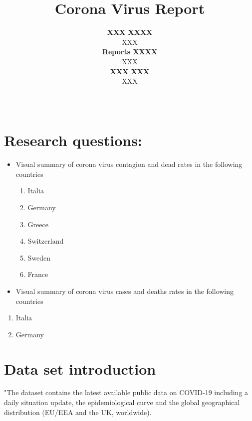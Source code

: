 \documentclass[11pt,a4paper,]{article}
\title{Corona Virus Report}
\author{\sf\Large\textbf{ XXX XXXX}\\ {\sf\large XXX\\[0.5cm]} \sf\Large\textbf{ Reports XXXX}\\ {\sf\large XXX\\[0.5cm]} \sf\Large\textbf{ XXX XXX}\\ {\sf\large XXX\\[0.5cm]}}
\date{\sf\Date~\Month~\Year}
\makeatletter
\def\titlepage{\front{\expandafter{\@title}}{\@author}{\@organization}}
\makeatother
\begin{document}
\titlepage

{
\setcounter{tocdepth}{2}
\tableofcontents
}
\clearpage

\hypertarget{research-questions}{%
\section{Research questions:}\label{research-questions}}


\begin{itemize}
\item
  Visual summary of corona virus contagion and dead rates in the following countries

  \begin{enumerate}
    \item Italia
    \item Germany
    \item Greece
    \item Switzerland 
    \item Sweden
    \item France
  \end{enumerate}
\item
  Visual summary of corona virus cases and deaths rates in the following countries
\end{itemize}

\begin{enumerate}
   \item Italia
   \item Germany
 \end{enumerate}

\hypertarget{data-set-introduction}{%
\section{Data set introduction}\label{data-set-introduction}}

"The dataset contains the latest available public data on COVID-19 including a daily situation update, the epidemiological curve and the global geographical distribution (EU/EEA and the UK, worldwide).
\end{document}
